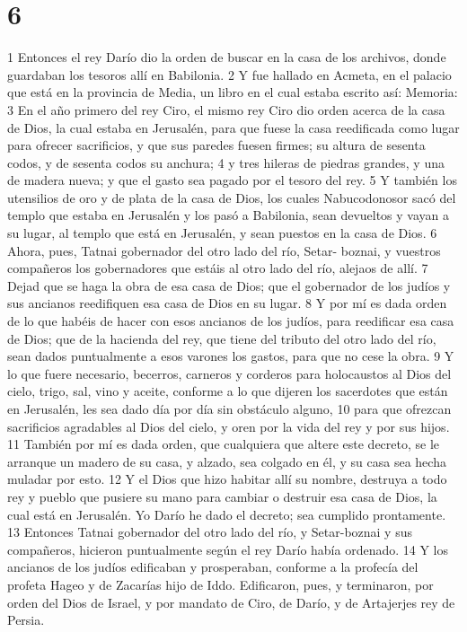 \chapter{6}

1 Entonces el rey Darío dio la orden de buscar en la casa de los archivos, donde guardaban los tesoros allí en Babilonia.
2 Y fue hallado en Acmeta, en el palacio que está en la provincia de Media, un libro en el cual estaba escrito así: Memoria:
3 En el año primero del rey Ciro, el mismo rey Ciro dio orden acerca de la casa de Dios, la cual estaba en Jerusalén, para que fuese la casa reedificada como lugar para ofrecer sacrificios, y que sus paredes fuesen firmes; su altura de sesenta codos,  y de sesenta codos su anchura;
4 y tres hileras de piedras grandes, y una de madera nueva; y que el gasto sea pagado por el tesoro del rey.
5 Y también los utensilios de oro y de plata de la casa de Dios, los cuales Nabucodonosor sacó del templo que estaba en Jerusalén y los pasó a Babilonia, sean devueltos y vayan a su lugar, al templo que está en Jerusalén, y sean puestos en la casa de Dios.
6 Ahora, pues, Tatnai gobernador del otro lado del río, Setar- boznai, y vuestros compañeros los gobernadores que estáis al otro lado del río, alejaos de allí.
7 Dejad que se haga la obra de esa casa de Dios; que el gobernador de los judíos y sus ancianos reedifiquen esa casa de Dios en su lugar.
8 Y por mí es dada orden de lo que habéis de hacer con esos ancianos de los judíos, para reedificar esa casa de Dios; que de la hacienda del rey, que tiene del tributo del otro lado del río, sean dados puntualmente a esos varones los gastos, para que no cese la obra.
9 Y lo que fuere necesario, becerros, carneros y corderos para holocaustos al Dios del cielo, trigo, sal, vino y aceite, conforme a lo que dijeren los sacerdotes que están en Jerusalén, les sea dado día por día sin obstáculo alguno,
10 para que ofrezcan sacrificios agradables al Dios del cielo, y oren por la vida del rey y por sus hijos.
11 También por mí es dada orden, que cualquiera que altere este decreto, se le arranque un madero de su casa, y alzado, sea colgado en él, y su casa sea hecha muladar por esto.
12 Y el Dios que hizo habitar allí su nombre, destruya a todo rey y pueblo que pusiere su mano para cambiar o destruir esa casa de Dios, la cual está en Jerusalén. Yo Darío he dado el decreto; sea cumplido prontamente.
13 Entonces Tatnai gobernador del otro lado del río, y Setar-boznai y sus compañeros, hicieron puntualmente según el rey Darío había ordenado.
14 Y los ancianos de los judíos edificaban y prosperaban, conforme a la profecía del profeta Hageo y de Zacarías hijo de Iddo. Edificaron, pues, y terminaron, por orden del Dios de Israel, y por mandato de Ciro, de Darío, y de Artajerjes rey de Persia.
